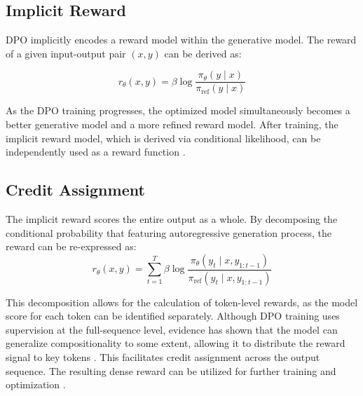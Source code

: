 \subsection{Implicit Reward}

DPO implicitly encodes a reward model within the generative model. The reward of a given input-output pair $(x, y)$ can be derived as:

$$r_{\theta}(x, y) = \beta \log \frac{\pi_\theta(y\mid x)}{\pi_{\mathrm{ref}}(y\mid x)}$$

As the DPO training progresses, the optimized model simultaneously becomes a better generative model and a more refined reward model. After training, the implicit reward model, which is derived via conditional likelihood, can be independently used as a reward function \citep{lambert2024rewardbench, chen2024bootstrappinglanguagemodelsdpo}.

\subsection{Credit Assignment}

The implicit reward scores the entire output as a whole. By decomposing the conditional probability that featuring autoregressive generation process, the reward can be re-expressed as:
$$r_{\theta}(x,y) = \sum_{t=1}^{T}\beta \log \frac{\pi_\theta(y_t\mid x,y_{1:t-1})}{\pi_{\mathrm{ref}}(y_t\mid x,y_{1:t-1})}$$

This decomposition allows for the calculation of token-level rewards, as the model score for each token can be identified separately. Although DPO training uses supervision at the full-sequence level, evidence has shown that the model can generalize compositionality to some extent, allowing it to distribute the reward signal to key tokens \citep{rafailov2024dpo2}. This facilitates credit assignment across the output sequence. The resulting dense reward can be utilized for further training and optimization \citep{zhong2024dpo-ppo}.

